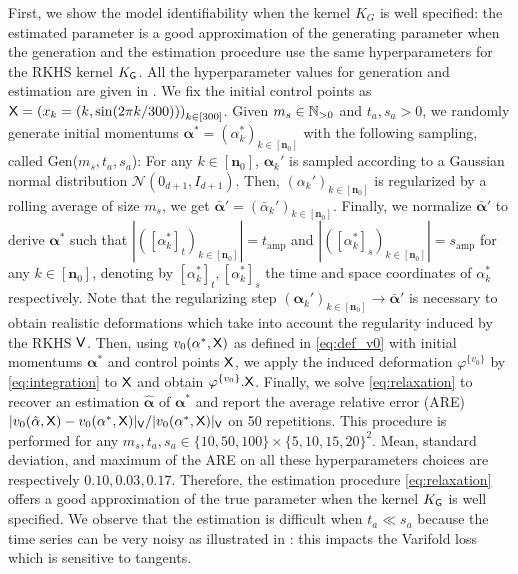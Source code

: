 First, we show the model identifiability when the kernel $K_G$ is well specified: the estimated parameter is a good approximation of the generating parameter when the generation and the estimation procedure use the same hyperparameters for the RKHS kernel $K_{\mathsf{G}}$.
All the hyperparameter values for generation and estimation are given in .
We fix the initial control points as $\mathsf{X}=\left(x_k=(k,\sin(2\pi k/300))\right)_{k\in[300]} $.
Given $m_{s}\in \mathbb{N}_{>0}$ and $t_{a},s_{a}>0$, we randomly generate initial momentums $\mathbf{\alpha}^*=(\alpha_k^*)_{k\in[\mathbf{n}_0]}$ with the following sampling, called Gen($m_s,t_a,s_a$):
For any $k\in[\mathbf{n}_0]$, $\mathbf{\alpha}_k'$ is sampled according to a Gaussian normal distribution $\mathcal{N}(0_{d+1},I_{d+1})$.
Then, $(\alpha_k')_{k\in[\mathbf{n}_0]}$ is regularized by a rolling average of size $m_{s}$, we get $\bar{\mathbf{\alpha}}'=(\bar{\alpha}_k')_{k\in[\mathbf{n}_0]}$.
Finally, we normalize $\bar{\mathbf{\alpha}}'$ to derive $\mathbf{\alpha}^*$ such that $|([\alpha_k^*]_t)_{k\in[\mathbf{n}_0]}|=t_{\text{amp}}$ and $|([\alpha_k^*]_s)_{k\in[\mathbf{n}_0]}|=s_{\text{amp}}$ for any $k\in[\mathbf{n}_0]$, denoting by $[\alpha_k^*]_t,[\alpha_k^*]_s$ the time and space coordinates of $\alpha_k^*$ respectively.
Note that the regularizing step $(\mathbf{\alpha}_k')_{k\in[\mathbf{n}_0]}\to \bar{\mathbf{\alpha}}' $ is necessary to obtain realistic deformations which take into account the regularity induced by the RKHS $\mathsf{V}$.
Then, using $v_0(\mathbf{\alpha}^*,\mathsf{X})$ as defined in \eqref{eq:def_v0} with initial momentums $\mathbf{\alpha}^*$ and control points $\mathsf{X}$, we apply the induced deformation $\varphi^{\{v_0\}} $ by \eqref{eq:integration} to $\mathsf{X}$ and obtain $\varphi^{\{v_0\}}.\mathsf{X}$.
Finally, we solve \eqref{eq:relaxation} to recover an estimation $\hat{\mathbf{\alpha}}$ of $\mathbf{\alpha}^*$ and report the average relative error (ARE) $|v_0(\hat{\mathbf{\alpha}},\mathsf{X})-v_0(\mathbf{\alpha}^*,\mathsf{X})|_{\mathsf{V}}/|v_0(\mathbf{\alpha}^*,\mathsf{X})|_{\mathsf{V}}$ on 50 repetitions.
This procedure is performed for any $m_{s},t_{a},s_{a}\in \{10,50,100\}\times \{5,10,15,20\}^2 $.
Mean, standard deviation, and maximum of the ARE on all these hyperparameters choices are respectively $\mathbf{0.10, 0.03, 0.17}$.
Therefore, the estimation procedure \eqref{eq:relaxation} offers a good approximation of the true parameter when the kernel $K_{\mathsf{G}}$ is well specified.
We observe that the estimation is difficult when $t_a\ll s_a$ because the time series can be very noisy as illustrated in : this impacts the Varifold loss which is sensitive to tangents.

